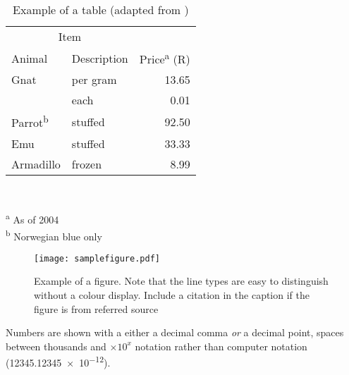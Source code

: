 \documentclass[a4paper,12pt]{article}
\begin{document}
\begin{table}[htbp]
  \centering
  \caption[Short caption for table of tables]{Example of a table (adapted from \citet{fear})}
  \label{tab:tabexample}
  \begin{minipage}{0.5\textwidth}
    \begin{centering}
      \begin{tabular}{@{}llr@{}} \toprule 
        \multicolumn{2}{c}{Item}                                               \\ 
        \cmidrule(r){1-2} 
        Animal                    & Description & Price\textsuperscript{a} (R) \\ 
        \midrule 
        Gnat                      & per gram    & \num{13.65}                  \\ 
                                  & each        & \num{0.01}                   \\ 
        Parrot\textsuperscript{b} & stuffed     & \num{92.50}                  \\ 
        Emu                       & stuffed     & \num{33.33}                  \\ 
        Armadillo                 & frozen      & \num{8.99}                   \\ 
        \bottomrule 
      \end{tabular}                                                            \\
    \end{centering} 
    \vspace{1em}
    \textsuperscript{a} As of 2004                                             \\
    \textsuperscript{b} Norwegian blue only
  \end{minipage}
\end{table}

\begin{figure}[htbp]
  \centering
  \texttt{[image: samplefigure.pdf]}
  \caption[Short caption which will be in the table of figures]{Example of a figure.  Note that the line types are easy to
    distinguish without a colour display.  Include a citation in the caption if the figure is from referred source}
  \label{fig:samplefigure}
\end{figure}

Numbers are shown with a either a decimal comma \emph{or} a decimal point, spaces between thousands and $\times 10^x$ notation rather than computer notation (\num{12345.12345e-12}).
\end{document}
